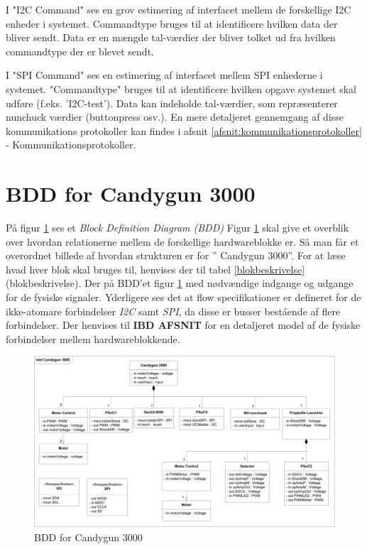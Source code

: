 I "I2C Command" ses en grov estimering af interfacet mellem de forskellige I2C enheder i systemet. Commandtype bruges til at identificere hvilken data der bliver sendt. Data er en mængde tal-værdier der bliver tolket ud fra hvilken commandtype der er blevet sendt.

I "SPI Command" ses en estimering af interfacet mellem SPI enhederne i systemet. "Commandtype" bruges til at identificere hvilken opgave systemet skal udføre (f.eks. 'I2C-test'). Data kan indeholde tal-værdier, som repræsenterer nunchuck værdier (buttonpress osv.). 
En mere detaljeret gennemgang af disse kommunikations protokoller kan findes i afsnit \ref{afsnit:kommunikationsprotokoller} - Kommunikationsprotokoller.

\section{BDD for Candygun 3000}
På figur \ref{fig:BDD} ses et \textit{Block Definition Diagram (BDD)} 
Figur \ref{fig:BDD} skal give et overblik over hvordan  relationerne mellem de forskellige hardwareblokke er. Så man får et overordnet billede af hvordan strukturen er for ” Candygun 3000”. For at læse hvad hver blok skal bruges til, henvises der til tabel \ref{blokbeskrivelse} (blokbeskrivelse). Der på BDD'et figur \ref{fig:BDD} med nødvændige indgange og udgange for de fysiske signaler. Yderligere ses det at flow specifikationer er defineret for de ikke-atomare forbindelser \textit{I2C} samt \textit{SPI}, da disse er busser bestående af flere forbindelser. Der henvises til \textbf{IBD AFSNIT} for en detaljeret model af de fysiske forbindelser mellem hardwareblokkende.



\begin{figure}[H]
	\centering
	\includegraphics[width= \textwidth]{Systemarkitektur/images/BDD_overordnet1.png}
	\caption{BDD for Candygun 3000}
	\label{fig:BDD}
\end{figure}


